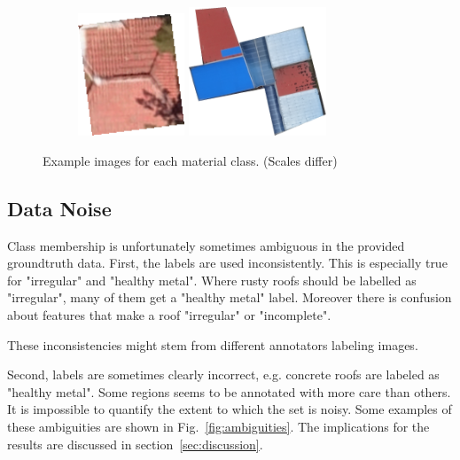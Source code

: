 \documentclass[11pt]{article}
\begin{document}
\begin{figure}
\begin{subfigure}[c]{0.32\textwidth}
		\end{subfigure}
		\begin{subfigure}[c]{0.32\textwidth}
			\centering
			\includegraphics[width=0.35\textwidth]{figures/mat_examples/other1.png}		
			\includegraphics[width=0.45\textwidth]{figures/mat_examples/other2.png}
		\end{subfigure}
	\caption{Example images for each material class. (Scales differ)}
	\label{fig:mat_examples}
	\end{figure}

\subsection{Data Noise}

Class membership is unfortunately sometimes ambiguous in the provided groundtruth data. 
First, the labels are used inconsistently. This is especially true for "irregular" and "healthy metal". Where rusty roofs should be labelled as "irregular", many of them get a "healthy metal" label.
Moreover there is confusion about features that make a roof "irregular" or "incomplete".

These inconsistencies might stem from different annotators labeling images.


Second, labels are sometimes clearly incorrect, e.g. concrete roofs are labeled as "healthy metal". Some regions seems to be annotated with more care than others. It is impossible to quantify the extent to which the set is noisy. 
Some examples of these ambiguities are shown in Fig.~\ref{fig:ambiguities}.
The implications for the results are discussed in section~\ref{sec:discussion}.
\end{document}
